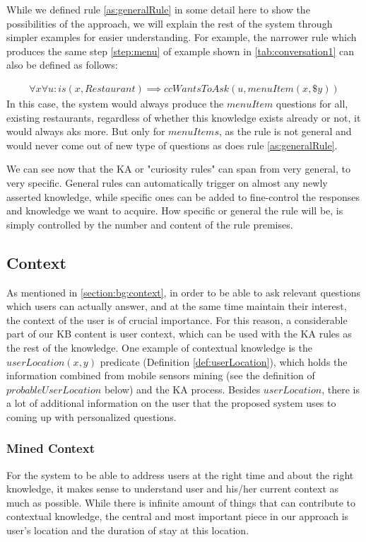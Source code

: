 While we defined rule \ref{as:generalRule} in some detail here to show the 
possibilities of the approach, we will explain the rest of the system through 
simpler examples for easier understanding. For example, the narrower rule which
produces the same step \ref{step:menu} of example shown in 
\autoref{tab:conversation1} can also be defined as follows:

\begin{equation}\label{as:specificRule}
\begin{gathered}
\forall x \forall u:is(x,Restaurant) \implies ccWantsToAsk(u,menuItem(x,\$y))
\end{gathered}
\end{equation}
In this case, the system would always produce the $menuItem$ questions for all, 
existing restaurants, regardless of whether this knowledge exists already or
not, it would always aks more. But only for $menuItems$, as the rule is not
general and would never come out of new type of questions as does rule 
\ref{as:generalRule}.

We can see now that the KA or "curiosity rules" can span from very general, to 
very specific. General rules can automatically trigger on almost any newly 
asserted knowledge, while specific ones can be added to fine-control the 
responses and knowledge we want to acquire. How specific or general the rule 
will be, is simply controlled by the number and content of the rule premises.

\subsection{Context}
\label{section:context}

As mentioned in \autoref{section:bg:context}, in order to be able to ask 
relevant questions which users can actually answer, and at the same time 
maintain their interest, the context of the user is of crucial importance. For 
this reason, a considerable part of our KB content is user context, which can 
be used with the KA rules as the rest of the knowledge. One example of 
contextual knowledge is the $userLocation(x,y)$ predicate 
(Definition \ref{def:userLocation}), which holds the information combined from 
mobile 
sensors mining (see the definition of $probableUserLocation$ below) and the KA 
process. Besides $userLocation$, there is a lot of additional information on the
user that the proposed system uses to coming up with personalized questions.

\subsubsection{Mined Context}
\label{section:minedContext}
For the system to be able to address users at the right time and about the right
knowledge, it makes sense to understand user and his/her current context as
much as possible. While there is infinite amount of things that can contribute
to contextual knowledge, the central and most important piece in our 
approach is user's location and the duration of stay at this location. 

